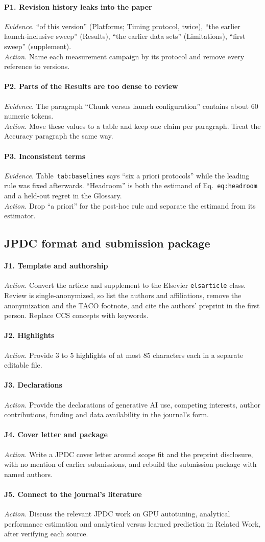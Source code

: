 \documentclass[11pt]{article}
\newcommand{\finding}[2]{\paragraph{#1. #2}}
\newcommand{\evidence}{\textit{Evidence.} }
\newcommand{\action}{\textit{Action.} }
\begin{document}
\finding{P1}{Revision history leaks into the paper}
\evidence ``of this version'' (Platforms; Timing protocol, twice), ``the earlier
launch-inclusive sweep'' (Results), ``the earlier data sets'' (Limitations), ``first sweep''
(supplement).\\
\action Name each measurement campaign by its protocol and remove every reference to versions.

\finding{P2}{Parts of the Results are too dense to review}
\evidence The paragraph ``Chunk versus launch configuration'' contains about 60 numeric
tokens.\\
\action Move these values to a table and keep one claim per paragraph. Treat the Accuracy
paragraph the same way.

\finding{P3}{Inconsistent terms}
\evidence Table~\texttt{tab:baselines} says ``six a priori protocols'' while the leading rule
was fixed afterwards. ``Headroom'' is both the estimand of Eq.~\texttt{eq:headroom} and a
held-out regret in the Glossary.\\
\action Drop ``a priori'' for the post-hoc rule and separate the estimand from its estimator.

\subsection*{JPDC format and submission package}

\finding{J1}{Template and authorship}
\action Convert the article and supplement to the Elsevier \texttt{elsarticle} class. Review
is single-anonymized, so list the authors and affiliations, remove the anonymization and the
TACO footnote, and cite the authors' preprint in the first person. Replace CCS concepts with
keywords.

\finding{J2}{Highlights}
\action Provide 3 to 5 highlights of at most 85 characters each in a separate editable file.

\finding{J3}{Declarations}
\action Provide the declarations of generative AI use, competing interests, author
contributions, funding and data availability in the journal's form.

\finding{J4}{Cover letter and package}
\action Write a JPDC cover letter around scope fit and the preprint disclosure, with no
mention of earlier submissions, and rebuild the submission package with named authors.

\finding{J5}{Connect to the journal's literature}
\action Discuss the relevant JPDC work on GPU autotuning, analytical performance estimation
and analytical versus learned prediction in Related Work, after verifying each source.
\end{document}
